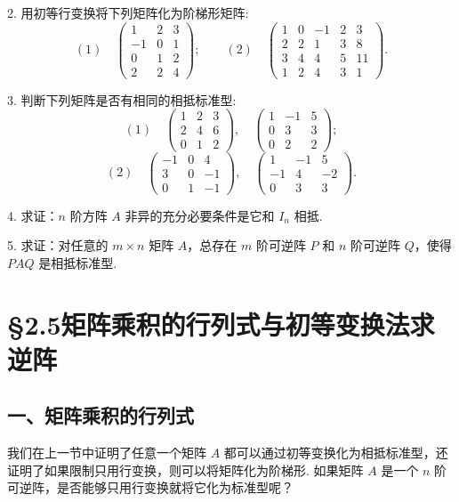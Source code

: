 \documentclass[UTF8, 12pt, fontset=fandol, oneside]{ctexart}
\begin{document}
2. 用初等行变换将下列矩阵化为阶梯形矩阵:
\[
(1)\quad
\left(\begin{array}{rrr}
1 & 2 & 3\\
-1 & 0 & 1\\
0 & 1 & 2\\
2 & 2 & 4
\end{array}\right);
\qquad
(2)\quad
\left(\begin{array}{rrrrr}
1 & 0 & -1 & 2 & 3\\
2 & 2 & 1 & 3 & 8\\
3 & 4 & 4 & 5 & 11\\
1 & 2 & 4 & 3 & 1
\end{array}\right).
\]

3. 判断下列矩阵是否有相同的相抵标准型:
\[
(1)\quad
\left(\begin{array}{rrr}
1 & 2 & 3\\
2 & 4 & 6\\
0 & 1 & 2
\end{array}\right),\quad
\left(\begin{array}{rrr}
1 & -1 & 5\\
0 & 3 & 3\\
0 & 2 & 2
\end{array}\right);
\]
\[
(2)\quad
\left(\begin{array}{rrr}
-1 & 0 & 4\\
3 & 0 & -1\\
0 & 1 & -1
\end{array}\right),\quad
\left(\begin{array}{rrr}
1 & -1 & 5\\
-1 & 4 & -2\\
0 & 3 & 3
\end{array}\right).
\]

4. 求证：$n$ 阶方阵 $A$ 非异的充分必要条件是它和 $I_n$ 相抵.

5. 求证：对任意的 $m\times n$ 矩阵 $A$，总存在 $m$ 阶可逆阵 $P$ 和 $n$ 阶可逆阵 $Q$，使得 $PAQ$ 是相抵标准型.

\section*{§2.5\quad 矩阵乘积的行列式与初等变换法求逆阵}

\subsection*{一、矩阵乘积的行列式}

我们在上一节中证明了任意一个矩阵 $A$ 都可以通过初等变换化为相抵标准型，还证明了如果限制只用行变换，则可以将矩阵化为阶梯形. 如果矩阵 $A$ 是一个 $n$ 阶可逆阵，是否能够只用行变换就将它化为标准型呢？
\end{document}
